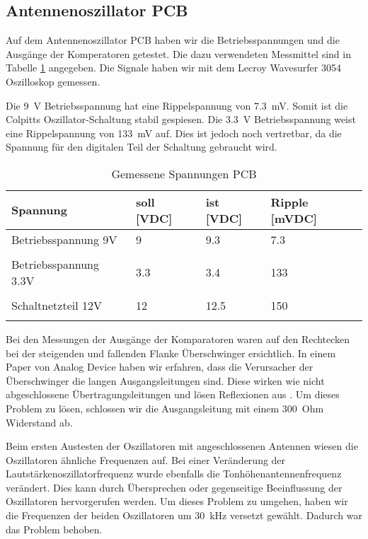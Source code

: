 \subsection{Antennenoszillator PCB}\label{subsec:PCB}
Auf dem Antennenoszillator PCB haben wir die Betriebsspannungen und die Ausgänge der Komperatoren getestet. Die dazu verwendeten Messmittel sind in Tabelle \ref{tab:Gemessene_Spannungen_PCB} angegeben. Die Signale haben wir mit dem Lecroy Wavesurfer 3054 Oszilloskop gemessen. 

Die \SI{9}{V} Betriebsspannung hat eine Rippelspannung von \SI{7.3}{mV}. Somit ist die Colpitts Oszillator-Schaltung stabil gespiesen. Die \SI{3.3}{V} Betriebsspannung weist eine Rippelspannung von \SI{133}{mV} auf. Dies ist jedoch noch vertretbar, da die Spannung für den digitalen Teil der Schaltung gebraucht wird.
\begin{table}[H]
	\centering
	\caption{Gemessene Spannungen PCB}
	\label{tab:Gemessene_Spannungen_PCB}
	\begin{tabular}{l|l|l|l}
		\textbf{Spannung} & \textbf{soll [VDC]} & \textbf{ist [VDC]} &	\textbf{Ripple [mVDC]}\\
		\hline \hline
		
		Betriebsspannung 9V & 9 & 9.3 &  7.3 \\ 
		&      &   &   \\ 
		\hline
		Betriebsspannung 3.3V & 3.3 & 3.4 &  133 \\ 
		&     &     &   \\ 
		\hline
		Schaltnetzteil 12V & 12 & 12.5 &  150 \\ 
		&     &       &   \\ 
		\hline
		
	\end{tabular}
\end{table} 

Bei den Messungen der Ausgänge der Komparatoren waren auf den Rechtecken bei der steigenden und fallenden Flanke Überschwinger ersichtlich. In einem Paper von Analog Device haben wir erfahren, dass die Verursacher der Überschwinger die langen Ausgangsleitungen sind. Diese wirken wie nicht abgeschlossene Übertragungsleitungen und lösen Reflexionen aus \cite{comparator_techniques}. Um dieses Problem zu lösen, schlossen wir die Ausgangsleitung mit einem \SI{300}{Ohm} Widerstand ab.

Beim ersten Austesten der Oszillatoren mit angeschlossenen Antennen wiesen die Oszillatoren ähnliche Frequenzen auf. Bei einer Veränderung der Lautstärkenoszillatorfrequenz wurde ebenfalls die Tonhöhenantennenfrequenz verändert. Dies kann durch Übersprechen oder gegenseitige Beeinflussung der Oszillatoren hervorgerufen werden. Um dieses Problem zu umgehen, haben wir die Frequenzen der beiden Oszillatoren um \SI{30}{kHz} versetzt gewählt. Dadurch war das Problem behoben. 

